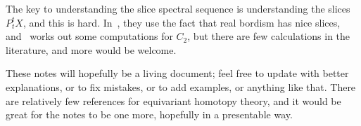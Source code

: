 The key to understanding the slice spectral sequence is understanding the slices $P_t^tX$, and this is hard.
In~\cite{HHR}, they use the fact that real bordism has nice slices, and~\cite{DuggerKR} works out some computations
for $C_2$, but there are few calculations in the literature, and more would be welcome.
%

These notes will hopefully be a living document; feel free to update with better explanations, or to fix mistakes,
or to add examples, or anything like that. There are relatively few references for equivariant homotopy theory, and
it would be great for the notes to be one more, hopefully in a presentable way.
